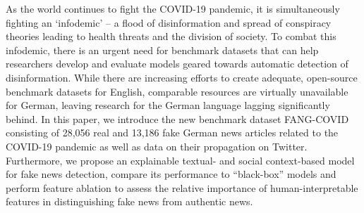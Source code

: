 As the world continues to fight the COVID-19 pandemic, it is simultaneously fighting an ‘infodemic' -- a flood of disinformation and spread of conspiracy theories leading to health threats and the division of society. To combat this infodemic, there is an urgent need for benchmark datasets that can help researchers develop and evaluate models geared towards automatic detection of disinformation. While there are increasing efforts to create adequate, open-source benchmark datasets for English, comparable resources are virtually unavailable for German, leaving research for the German language lagging significantly behind. In this paper, we introduce the new benchmark dataset FANG-COVID consisting of 28,056 real and 13,186 fake German news articles related to the COVID-19 pandemic as well as data on their propagation on Twitter. Furthermore, we propose an explainable textual- and social context-based model for fake news detection, compare its performance to ``black-box'' models and perform feature ablation to assess the relative importance of human-interpretable features in distinguishing fake news from authentic news.

